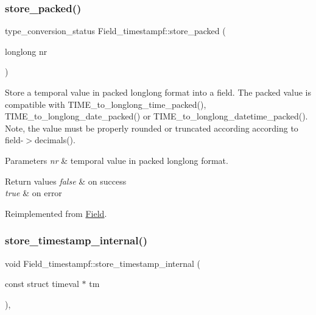\subsubsection{\texorpdfstring{store\+\_\+packed()}{store\_packed()}}
{\footnotesize\ttfamily type\+\_\+conversion\+\_\+status Field\+\_\+timestampf\+::store\+\_\+packed (\begin{DoxyParamCaption}\item[{longlong}]{nr }\end{DoxyParamCaption})\hspace{0.3cm}{\ttfamily [virtual]}}

Store a temporal value in packed longlong format into a field. The packed value is compatible with T\+I\+M\+E\+\_\+to\+\_\+longlong\+\_\+time\+\_\+packed(), T\+I\+M\+E\+\_\+to\+\_\+longlong\+\_\+date\+\_\+packed() or T\+I\+M\+E\+\_\+to\+\_\+longlong\+\_\+datetime\+\_\+packed(). Note, the value must be properly rounded or truncated according according to field-\/$>$decimals().


\begin{DoxyParams}{Parameters}
{\em nr} & temporal value in packed longlong format. \\
\hline
\end{DoxyParams}

\begin{DoxyRetVals}{Return values}
{\em false} & on success \\
\hline
{\em true} & on error \\
\hline
\end{DoxyRetVals}


Reimplemented from \mbox{\hyperlink{classField_a5c09752e8441d64ce2e4e611508bab7a}{Field}}.

\mbox{\label{classField__timestampf_a93e60b040799d30057489d11e3c65676}} 
\subsubsection{\texorpdfstring{store\+\_\+timestamp\+\_\+internal()}{store\_timestamp\_internal()}}
{\footnotesize\ttfamily void Field\+\_\+timestampf\+::store\+\_\+timestamp\+\_\+internal (\begin{DoxyParamCaption}\item[{const struct timeval $\ast$}]{tm }\end{DoxyParamCaption})\hspace{0.3cm}{\ttfamily [protected]}, {\ttfamily [virtual]}}


